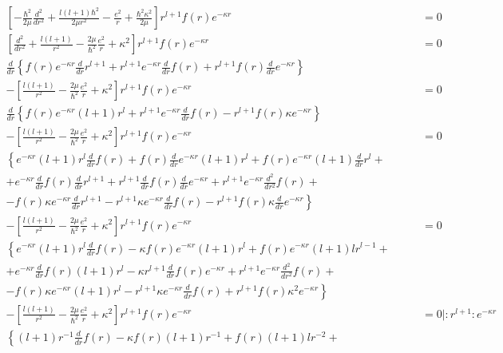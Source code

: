 \begin{align*}
  \left[-\frac{\hbar^2}{2\mu}\frac{d^2}{dr^2} + \frac{l(l+1)\hbar^2}{2\mu r^2}- \frac{e^2}{r} + \frac{\hbar^2 \kappa^2}{2\mu}  \right] r^{l+1}f(r)e^{-\kappa r}   &= 0 \\
\left[\frac{d^2}{dr^2} + \frac{l(l+1)}{r^2}- \frac{2\mu}{\hbar^2}\frac{e^2}{r} + \kappa^2  \right] r^{l+1}f(r)e^{-\kappa r}   &= 0 \\ 
\frac{d}{dr}\left\{f(r)e^{-\kappa r} \frac{d}{dr}r^{l+1}+ r^{l+1}e^{-\kappa r}\frac{d}{dr} f(r) + r^{l+1} f(r)\frac{d}{dr}e^{-\kappa r}\right\}\\ - \left[\frac{l(l+1)}{r^2}- \frac{2\mu}{\hbar^2}\frac{e^2}{r} + \kappa^2  \right] r^{l+1} f(r)e^{-\kappa r}   &= 0 \\ 
\frac{d}{dr}\left\{f(r)e^{-\kappa r}(l+1)r^{l}+ r^{l+1}e^{-\kappa r}\frac{d}{dr} f(r) - r^{l+1} f(r)\kappa e^{-\kappa r}\right\} \\- \left[\frac{l(l+1)}{r^2}- \frac{2\mu}{\hbar^2}\frac{e^2}{r} + \kappa^2  \right] r^{l+1} f(r)e^{-\kappa r}   &= 0 \\
\left\{ e^{-\kappa r}(l+1)r^{l} \frac{d}{dr}f(r) +  f(r)\frac{d}{dr} e^{-\kappa r}(l+1)r^{l}+f(r)  e^{-\kappa r}(l+1)\frac{d}{dr}r^{l} +\right.\qquad&\\
+e^{-\kappa r}\frac{d}{dr} f(r)\frac{d}{dr}r^{l+1} +r^{l+1}\frac{d}{dr} f(r)\frac{d}{dr}e^{-\kappa r}+r^{l+1}e^{-\kappa r}\frac{d^2}{dr^2} f(r)+\qquad&\\
\left.- f(r)\kappa e^{-\kappa r}\frac{d}{dr}r^{l+1}-r^{l+1}\kappa e^{-\kappa r} \frac{d}{dr}f(r)-r^{l+1} f(r)\kappa \frac{d}{dr}e^{-\kappa r}\right\} \qquad&\\
- \left[\frac{l(l+1)}{r^2}- \frac{2\mu}{\hbar^2}\frac{e^2}{r} + \kappa^2  \right] r^{l+1} f(r)e^{-\kappa r}   &= 0 \\
\left\{ e^{-\kappa r}(l+1)r^{l} \frac{d}{dr}f(r) - \kappa f(r) e^{-\kappa r}(l+1)r^{l}+f(r)  e^{-\kappa r}(l+1)lr^{l-1} +\right.\qquad&\\
+e^{-\kappa r}\frac{d}{dr} f(r)(l+1)r^{l} -\kappa r^{l+1}\frac{d}{dr} f(r)e^{-\kappa r}+r^{l+1}e^{-\kappa r}\frac{d^2}{dr^2} f(r)+\qquad&\\
\left.- f(r)\kappa e^{-\kappa r}(l+1)r^{l}-r^{l+1}\kappa e^{-\kappa r} \frac{d}{dr}f(r)+r^{l+1} f(r)\kappa^2 e^{-\kappa r}\right\} \qquad&\\
- \left[\frac{l(l+1)}{r^2}- \frac{2\mu}{\hbar^2}\frac{e^2}{r} + \kappa^2  \right] r^{l+1} f(r)e^{-\kappa r}   &= 0 |:r^{l+1}:e^{-\kappa r}\\
\left\{(l+1)r^{-1} \frac{d}{dr}f(r) - \kappa f(r) (l+1)r^{-1}+f(r)  (l+1)lr^{-2} +\right.\qquad&\\

\end{align*}
